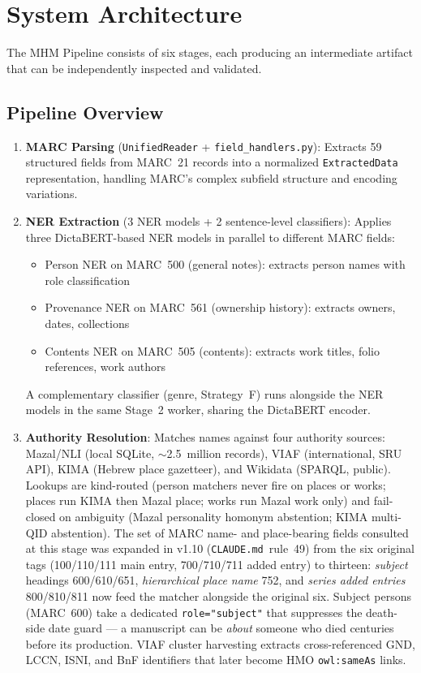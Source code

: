\documentclass[Afour,sageh,times]{sagej}
\begin{document}
\section{System Architecture}
\label{sec:architecture}

The MHM Pipeline consists of six stages, each producing an intermediate artifact that can be independently inspected and validated.

\subsection{Pipeline Overview}

\begin{enumerate}[leftmargin=*]
\item \textbf{MARC Parsing} (\texttt{UnifiedReader} + \texttt{field\_handlers.py}): Extracts 59 structured fields from MARC~21 records into a normalized \texttt{ExtractedData} representation, handling MARC's complex subfield structure and encoding variations.

\item \textbf{NER Extraction} (3 NER models + 2 sentence-level classifiers): Applies three DictaBERT-based NER models in parallel to different MARC fields:
  \begin{itemize}
    \item Person NER on MARC~500 (general notes): extracts person names with role classification
    \item Provenance NER on MARC~561 (ownership history): extracts owners, dates, collections
    \item Contents NER on MARC~505 (contents): extracts work titles, folio references, work authors
  \end{itemize}
  A complementary classifier (genre, Strategy~F) runs alongside the NER models in the same Stage~2 worker, sharing the DictaBERT encoder.

\item \textbf{Authority Resolution}: Matches names against four authority sources: Mazal/NLI (local SQLite, $\sim$2.5~million records), VIAF (international, SRU API), KIMA (Hebrew place gazetteer), and Wikidata (SPARQL, public). Lookups are kind-routed (person matchers never fire on places or works; places run KIMA then Mazal place; works run Mazal work only) and fail-closed on ambiguity (Mazal personality homonym abstention; KIMA multi-QID abstention). The set of MARC name- and place-bearing fields consulted at this stage was expanded in v1.10 (\texttt{CLAUDE.md}~rule~49) from the six original tags (100/110/111 main entry, 700/710/711 added entry) to thirteen: \emph{subject} headings 600/610/651, \emph{hierarchical place name} 752, and \emph{series added entries} 800/810/811 now feed the matcher alongside the original six. Subject persons (MARC~600) take a dedicated \texttt{role="subject"} that suppresses the death-side date guard --- a manuscript can be \emph{about} someone who died centuries before its production. VIAF cluster harvesting extracts cross-referenced GND, LCCN, ISNI, and BnF identifiers that later become HMO \texttt{owl:sameAs} links.


\end{enumerate}
\end{document}
